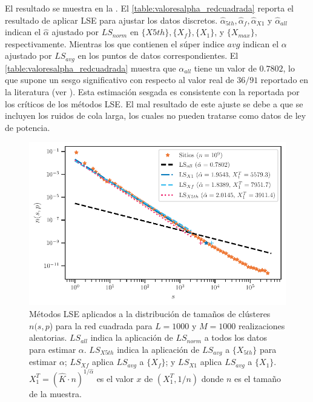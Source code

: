 El resultado se muestra en la .  El \cref{table:valoresalpha_redcuadrada}  reporta el resultado de aplicar LSE para ajustar los datos discretos.  $\hat{\alpha}_{5th},  \hat{\alpha}_{f}, \hat{\alpha}_{X1}$ y $\hat{\alpha}_{all}$ indican el  $\hat{\alpha}$  ajustado por $LS_{norm}$ en $\{X5th\}, \{X_f\}, \{X_1\}$, y $\{X_{max}\}$, respectivamente. Mientras los que contienen el súper indice $avg$   indican el  $\alpha$ ajustado por $LS_{avg}$ en los puntos de datos correspondientes.   El \cref{table:valoresalpha_redcuadrada}   muestra  que  $\alpha_{all}$ tiene un valor de $0.7802$, lo que supone un sesgo significativo con respecto al valor real de $36/91$ reportado en la literatura (ver  ).  Esta estimación sesgada es consistente con la reportada por los críticos de los métodos LSE. El mal resultado de este ajuste se debe a que se incluyen los ruidos de cola larga, los cuales no pueden tratarse como datos de ley de potencia.






\begin{figure}[h!]
	\centering{}\includegraphics[width=\imsize]{ley_potencia_red_cuadrada.pdf}
	\caption[Métodos LSE  aplicados a la distribución de tamaños de clústeres $n(s,p$) para la red cuadrada para $L=1000$ y $M=1000$ realizaciones aleatorias.]{Métodos LSE  aplicados a la distribución de tamaños de clústeres $n(s,p$) para la red cuadrada para $L=1000$ y $M=1000$ realizaciones aleatorias. $LS_{all}$ indica la aplicación de $LS_{norm}$ a todos los datos para estimar $\alpha$. $LS_{X5th}$ indica la aplicación de $LS_{avg}$ a $\{X_{5th}\}$ para estimar $\alpha$; $LS_{Xf}$ aplica $LS_{avg}$ a $\{X_f\}$; y $LS_{X1}$ aplica $LS_{avg}$ a $\{X_1\}$. $X_1^T=\left(\hat{K}\cdot n\right)^{1/\hat{\alpha}}$ es el valor $x$ de  $(X^T_1,1/n)$ donde $n$ es el tamaño de la muestra.}\label{f:ley_potencia_red_cuadrada}  
\end{figure}




